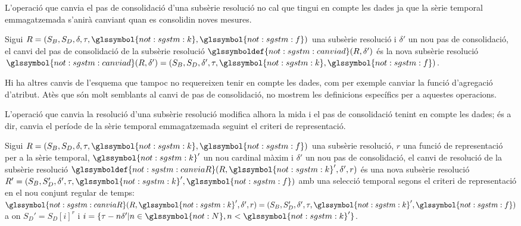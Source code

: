 L'operació que canvia el pas de consolidació d'una subsèrie resolució
no cal que tingui en compte les dades ja que la sèrie temporal
emmagatzemada s'anirà canviant quan es consolidin noves mesures.
\begin{definition}
  \label{def:sgstm:canviad}
  Sigui $R = (S_B,S_D,\delta,\tau,\glssymbol{not:sgstm:k},\glssymbol{not:sgstm:f})$ una subsèrie resolució i
  $\delta'$ un nou pas de consolidació, el canvi del pas de
  consolidació de la subsèrie resolució
  $\glssymboldef{not:sgstm:canviad}(R,\delta')$ és la nova subsèrie resolució
  $\glssymbol{not:sgstm:canviad}(R,\delta')=(S_B,S_D,\delta',\tau,\glssymbol{not:sgstm:k},\glssymbol{not:sgstm:f})$.
\end{definition}

Hi ha altres canvis de l'esquema que tampoc no requereixen tenir en
compte les dades, com per exemple canviar la funció d'agregació
d'atribut. Atès que són molt semblants al canvi de pas de
consolidació, no mostrem les definicions específics per a aquestes
operacions.


L'operació que canvia la resolució d'una subsèrie resolució modifica
alhora la mida i el pas de consolidació tenint en compte les dades; és
a dir, canvia el període de la sèrie temporal emmagatzemada seguint el
criteri de representació.
\begin{definition}
  Sigui $R = (S_B,S_D,\delta,\tau,\glssymbol{not:sgstm:k},\glssymbol{not:sgstm:f})$ una subsèrie resolució, $r$
  una funció de representació per a la sèrie temporal, $\glssymbol{not:sgstm:k}'$ un nou
  cardinal màxim i $\delta'$ un nou pas de consolidació, el canvi de
  resolució de la subsèrie resolució
  $\glssymboldef{not:sgstm:canviaR}(R,\glssymbol{not:sgstm:k}',\delta',r)$ és una nova subsèrie
  resolució $R' = (S_B,S_D',\delta',\tau,\glssymbol{not:sgstm:k}',\glssymbol{not:sgstm:f})$ amb una selecció
  temporal segons el criteri de representació en el nou conjunt
  regular de temps:
  $\glssymbol{not:sgstm:canviaR}(R,\glssymbol{not:sgstm:k}',\delta',r)=(S_B,S_D',\delta',\tau,\glssymbol{not:sgstm:k}',\glssymbol{not:sgstm:f})$
  a on $S_D' = S_D[i]^r$ i $i=\{ \tau-n\delta' | n\in\glssymbol{not:N},n<\glssymbol{not:sgstm:k}'
  \}$.
\end{definition}


